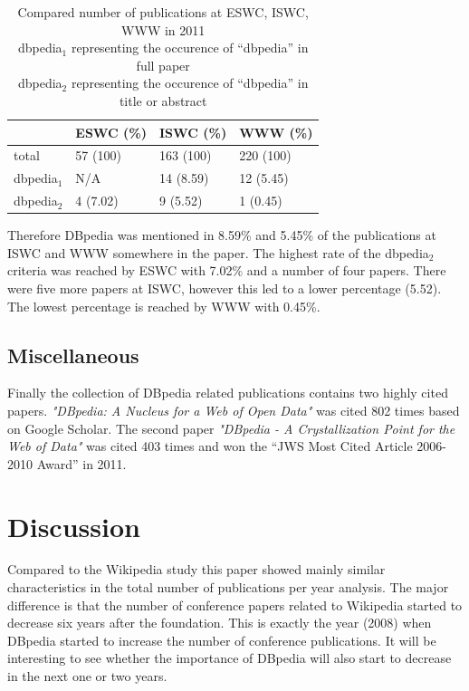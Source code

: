 \documentclass[english]{lni}
\begin{document}
\begin{table}[htb]
\caption{\centering Compared number of publications at ESWC, ISWC, WWW in 2011 \\dbpedia$_{1}$ representing the occurence of ``dbpedia'' in full paper \\dbpedia$_{2}$ representing the occurence of ``dbpedia'' in title or abstract} \label{tab:vergleich}
\begin{center}
\begin{tabular}{llll}
\hline
                &  ESWC (\%)  &  ISWC (\%)  &  WWW (\%)   \\
\hline
 total          &  57 (100)   &  163 (100)  &  220 (100)  \\
 dbpedia$_{1}$  &  N/A        &  14 (8.59)  &  12 (5.45)  \\
 dbpedia$_{2}$  &  4 (7.02)   &  9 (5.52)   &  1 (0.45)   \\
\hline
\end{tabular}
\end{center}
\end{table}


   Therefore DBpedia was mentioned in 8.59\% and 5.45\% of the publications at
   ISWC and WWW somewhere in the paper. The highest rate of the dbpedia$_{2}$
   criteria was reached by ESWC with 7.02\% and a number of four papers. There
   were five more papers at ISWC, however this led to a lower percentage
   (5.52). The lowest percentage is reached by WWW with 0.45\%.
\subsection{Miscellaneous}
\label{sec-3-4}

   Finally the collection of DBpedia related publications contains two highly
   cited papers. \textit{"DBpedia: A Nucleus for a Web of Open Data"} \cite{auer2007dbpedia} was cited 802
   times based on Google Scholar. The second paper \textit{"DBpedia - A Crystallization
   Point for the Web of Data"} \cite{bizer2009dbpedia} was cited 403 times and won the ``JWS Most Cited
   Article 2006-2010 Award'' in 2011.

\newpage
\section{Discussion}
\label{sec-4}


  Compared to the Wikipedia study this paper showed mainly similar
  characteristics in the total number of publications per year analysis. The
  major difference is that the number of conference papers related to Wikipedia
  started to decrease six years after the foundation. This is exactly the year
  (2008) when DBpedia started to increase the number of conference
  publications. It will be interesting to see whether the importance of DBpedia
  will also start to decrease in the next one or two years.
\end{document}
